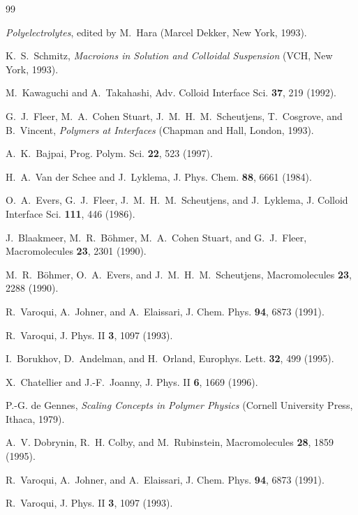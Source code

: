\documentclass[12pt,a4paper]{article}
\begin{document}
\begin{english}
\begin{thebibliography}{99}

\textit{Polyelectrolytes}, edited by M.~Hara (Marcel Dekker, New York, 1993).

K.~S.~Schmitz, \textit{Macroions in Solution and Colloidal Suspension} (VCH, New York, 1993).

M.~Kawaguchi and A.~Takahashi, Adv. Colloid Interface Sci. \textbf{37}, 219 (1992).

G.~J.~Fleer, M.~A.~Cohen Stuart, J.~M.~H.~M.~Scheutjens, T.~Cosgrove, and B.~Vincent, \textit{Polymers at Interfaces} (Chapman and Hall, London, 1993).

A.~K.~Bajpai, Prog. Polym. Sci. \textbf{22}, 523 (1997).

H.~A.~Van der Schee and J.~Lyklema, J. Phys. Chem. \textbf{88}, 6661 (1984).

O.~A.~Evers, G.~J.~Fleer, J.~M.~H.~M.~Scheutjens, and J.~Lyklema, J. Colloid Interface Sci. \textbf{111}, 446 (1986).

J.~Blaakmeer, M.~R.~Böhmer, M.~A.~Cohen Stuart, and G.~J.~Fleer, Macromolecules \textbf{23}, 2301 (1990).

M.~R.~Böhmer, O.~A.~Evers, and J.~M.~H.~M.~Scheutjens, Macromolecules \textbf{23}, 2288 (1990).

R.~Varoqui, A.~Johner, and A.~Elaissari, J. Chem. Phys. \textbf{94}, 6873 (1991).

R.~Varoqui, J. Phys. II \textbf{3}, 1097 (1993).

I.~Borukhov, D.~Andelman, and H.~Orland, Europhys. Lett. \textbf{32}, 499 (1995).

X.~Chatellier and J.-F.~Joanny, J. Phys. II \textbf{6}, 1669 (1996).

P.-G. de Gennes, \textit{Scaling Concepts in Polymer Physics} (Cornell University Press, Ithaca, 1979).

A.~V. Dobrynin, R.~H. Colby, and M.~Rubinstein, Macromolecules \textbf{28}, 1859 (1995).

R.~Varoqui, A.~Johner, and A.~Elaissari, J. Chem. Phys. \textbf{94}, 6873 (1991).

R.~Varoqui, J. Phys. II \textbf{3}, 1097 (1993).


\end{thebibliography}
\end{english}
\end{document}
